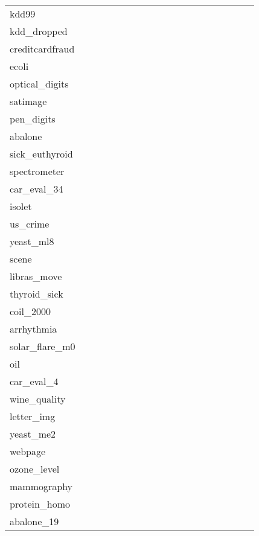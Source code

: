 \begin{table}[hbtb]
\begin{tabular}{l|*{18}{c|}}
        kdd99 &&&&&&&&&&&&&&&&&& \\
        kdd\_dropped &&&&&&&&&&&&&&&&&& \\
        creditcardfraud &&&&&&&&&&&&&&&&&& \\
        ecoli &&&&&&&&&&&&&&&&&& \\
        optical\_digits &&&&&&&&&&&&&&&&&& \\
        satimage &&&&&&&&&&&&&&&&&& \\
        pen\_digits &&&&&&&&&&&&&&&&&& \\
        abalone &&&&&&&&&&&&&&&&&& \\
        sick\_euthyroid &&&&&&&&&&&&&&&&&& \\
        spectrometer &&&&&&&&&&&&&&&&&& \\
        car\_eval\_34 &&&&&&&&&&&&&&&&&& \\
        isolet &&&&&&&&&&&&&&&&&& \\
        us\_crime &&&&&&&&&&&&&&&&&& \\
        yeast\_ml8 &&&&&&&&&&&&&&&&&& \\
        scene &&&&&&&&&&&&&&&&&& \\
        libras\_move &&&&&&&&&&&&&&&&&& \\
        thyroid\_sick &&&&&&&&&&&&&&&&&& \\
        coil\_2000 &&&&&&&&&&&&&&&&&& \\
        arrhythmia &&&&&&&&&&&&&&&&&& \\
        solar\_flare\_m0 &&&&&&&&&&&&&&&&&& \\
        oil &&&&&&&&&&&&&&&&&& \\
        car\_eval\_4 &&&&&&&&&&&&&&&&&& \\
        wine\_quality &&&&&&&&&&&&&&&&&& \\
        letter\_img &&&&&&&&&&&&&&&&&& \\
        yeast\_me2 &&&&&&&&&&&&&&&&&& \\
        webpage &&&&&&&&&&&&&&&&&& \\
        ozone\_level &&&&&&&&&&&&&&&&&& \\
        mammography &&&&&&&&&&&&&&&&&& \\
        protein\_homo &&&&&&&&&&&&&&&&&& \\
        abalone\_19 &&&&&&&&&&&&&&&&&& \\

    \end{tabular}

\end{table}

\newpage
